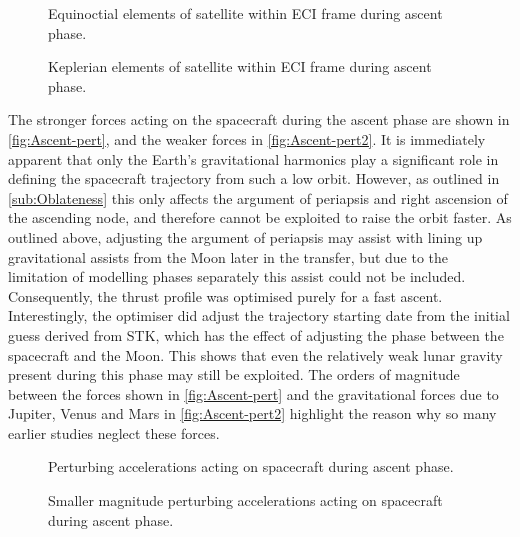 \begin{figure}
\centering
\def\svgwidth{\figurewidth}

\caption{Equinoctial elements of satellite within ECI frame during ascent phase.} \label{fig:Ascent-mee}
\end{figure}

\begin{figure}
\centering
\def\svgwidth{\figurewidth}

\caption{Keplerian elements of satellite within ECI frame during ascent phase.} \label{fig:Ascent-kep}
\end{figure}

The stronger forces acting on the spacecraft during the ascent phase are shown in \autoref{fig:Ascent-pert}, and the weaker forces in \autoref{fig:Ascent-pert2}. It is immediately apparent that only the Earth's gravitational harmonics play a significant role in defining the spacecraft trajectory from such a low orbit. However, as outlined in \autoref{sub:Oblateness} this only affects the argument of periapsis and right ascension of the ascending node, and therefore cannot be exploited to raise the orbit faster. As outlined above, adjusting the argument of periapsis may assist with lining up gravitational assists from the Moon later in the transfer, but due to the limitation of modelling phases separately this assist could not be included. Consequently, the thrust profile was optimised purely for a fast ascent. Interestingly, the optimiser did adjust the trajectory starting date from the initial guess derived from STK, which has the effect of adjusting the phase between the spacecraft and the Moon. This shows that even the relatively weak lunar gravity present during this phase may still be exploited. The orders of magnitude between the forces shown in \autoref{fig:Ascent-pert} and the gravitational forces due to Jupiter, Venus and Mars in \autoref{fig:Ascent-pert2} highlight the reason why so many earlier studies neglect these forces. 

\begin{subfigures}
\begin{figure}
\centering
\def\svgwidth{\figurewidth}

\caption{Perturbing accelerations acting on spacecraft during ascent phase.} \label{fig:Ascent-pert}
\end{figure}

\begin{figure}
\centering
\def\svgwidth{\figurewidth}

\caption{Smaller magnitude perturbing accelerations acting on spacecraft during ascent phase.} \label{fig:Ascent-pert2}
\end{figure}
\end{subfigures}

